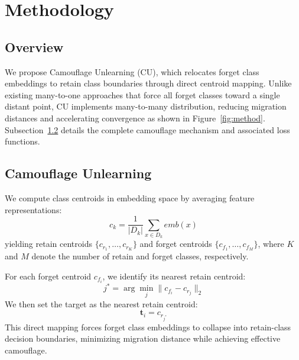 

\section{Methodology}
\label{sec:4}
\subsection{Overview}
We propose Camouflage Unlearning (CU), which relocates forget class embeddings to retain class boundaries through direct centroid mapping. Unlike existing many-to-one approaches that force all forget classes toward a single distant point, CU implements many-to-many distribution, reducing migration distances and accelerating convergence as shown in Figure~\ref{fig:method}. Subsection~\ref{4.2} details the complete camouflage mechanism and associated loss functions.

\subsection{Camouflage Unlearning}
\label{4.2}
We compute class centroids in embedding space by averaging feature representations:
\begin{equation}
c_k = \frac{1}{|D_k|}\sum_{x \in D_k} \textit{emb}(x)
\end{equation}
yielding retain centroids $\{c_{r_1}, \dots, c_{r_K}\}$ and forget centroids $\{c_{f_1}, \dots, c_{f_M}\}$, where $K$ and $M$ denote the number of retain and forget classes, respectively.

For each forget centroid $c_{f_i}$, we identify its nearest retain centroid:
\begin{equation}
j^* = \arg\min_j \|c_{f_i} - c_{r_j}\|_2
\end{equation}
We then set the target as the nearest retain centroid:
\begin{equation}
\mathbf{t}_i = c_{r_{j^*}}
\end{equation}
This direct mapping forces forget class embeddings to collapse into retain-class decision boundaries, minimizing migration distance while achieving effective camouflage.

